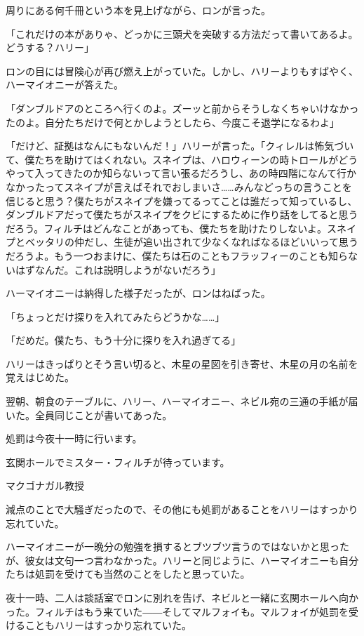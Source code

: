 \documentclass[10pt,a4paper]{article}
\begin{document}
\begin{CJK}{UTF8}{min}
周りにある何千冊という本を見上げながら、ロンが言った。

「これだけの本がありゃ、どっかに三頭犬を突破する方法だって書いてあるよ。どうする？ハリー」

ロンの目には冒険心が再び燃え上がっていた。しかし、ハリーよりもすばやく、ハーマイオニーが答えた。

「ダンブルドアのところへ行くのよ。ズーッと前からそうしなくちゃいけなかったのよ。自分たちだけで何とかしようとしたら、今度こそ退学になるわよ」

「だけど、証拠はなんにもないんだ！」ハリーが言った。「クィレルは怖気づいて、僕たちを助けてはくれない。スネイプは、ハロウィーンの時トロールがどうやって入ってきたのか知らないって言い張るだろうし、あの時四階になんて行かなかったってスネイプが言えばそれでおしまいさ……みんなどっちの言うことを信じると思う？僕たちがスネイプを嫌ってるってことは誰だって知っているし、ダンブルドアだって僕たちがスネイプをクビにするために作り話をしてると思うだろう。フィルチはどんなことがあっても、僕たちを助けたりしないよ。スネイプとベッタリの仲だし、生徒が追い出されて少なくなればなるほどいいって思うだろうよ。もう一つおまけに、僕たちは石のこともフラッフィーのことも知らないはずなんだ。これは説明しようがないだろう」

ハーマイオニーは納得した様子だったが、ロンはねばった。

「ちょっとだけ探りを入れてみたらどうかな……」

「だめだ。僕たち、もう十分に探りを入れ過ぎてる」

ハリーはきっぱりとそう言い切ると、木星の星図を引き寄せ、木星の月の名前を覚えはじめた。

翌朝、朝食のテーブルに、ハリー、ハーマイオニー、ネビル宛の三通の手紙が届いた。全員同じことが書いてあった。



処罰は今夜十一時に行います。

玄関ホールでミスター・フィルチが待っています。

マクゴナガル教授



減点のことで大騒ぎだったので、その他にも処罰があることをハリーはすっかり忘れていた。

ハーマイオニーが一晩分の勉強を損するとブツブツ言うのではないかと思ったが、彼女は文句一つ言わなかった。ハリーと同じように、ハーマイオニーも自分たちは処罰を受けても当然のことをしたと思っていた。

夜十一時、二人は談話室でロンに別れを告げ、ネビルと一緒に玄関ホールへ向かった。フィルチはもう来ていた――そしてマルフォイも。マルフォイが処罰を受けることもハリーはすっかり忘れていた。


\end{CJK}
\end{document}
